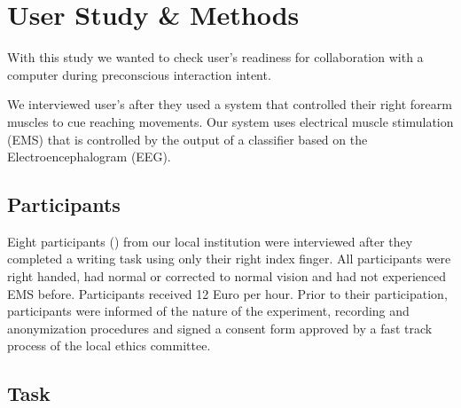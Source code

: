 

\section{User Study \& Methods}

With this study we wanted to check user's readiness for collaboration with a computer during preconscious interaction intent.

We interviewed user's after they used a system that controlled their right forearm muscles to cue reaching movements. Our system uses electrical muscle stimulation (EMS) that is controlled by the output of a classifier based on the Electroencephalogram (EEG).

\subsection{Participants}

 Eight participants () from our local institution were interviewed after they completed a writing task using only their right index finger. All participants were right handed, had normal or corrected to normal vision and had not experienced EMS before. Participants received 12 Euro per hour. Prior to their participation, participants were informed of the nature of the experiment, recording and anonymization procedures and signed a consent form approved by a fast track process of the local ethics committee.

\subsection{Task}

